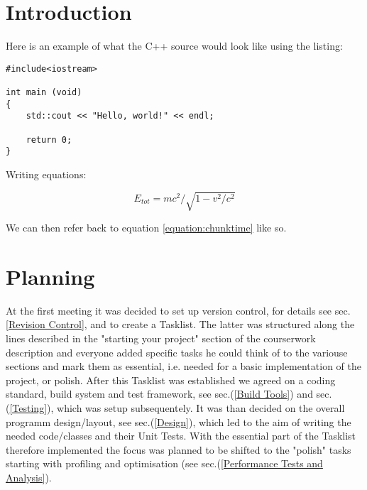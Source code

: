 \documentclass[12pt,a4paper]{article}
\begin{document}
\maketitle
\newpage


\tableofcontents
\newpage




\section{Introduction}

Here is an example of what the C++ source would look like using the listing: 
 
\begin{lstlisting}
#include<iostream> 

int main (void)
{
	std::cout << "Hello, world!" << endl;

	return 0; 
}
\end{lstlisting}

Writing equations:  

\begin{equation} 
E_{tot} = m c^2 / \sqrt{1 - {v^2/c^2}}
\label{equation:chunktime}
\end{equation}

We can then refer back to equation \ref{equation:chunktime} like so. 




\section{Planning}
\label{Planning}
At the first meeting it was decided to set up version control, for details see sec.\ref{Revision Control}, and to create a Tasklist.
The latter was structured along the lines described in the "starting your project" section of the courserwork description and everyone
added specific tasks he could think of to the variouse sections and mark them as essential, i.e. needed for a basic implementation of the project, or polish.
After this Tasklist was established we agreed on a coding standard, build system and test framework, see sec.(\ref{Build Tools}) and sec.(\ref{Testing}), which was setup subsequentely.
It was than decided on the overall programm design/layout, see sec.(\ref{Design}), which led to the aim of writing the needed code/classes and their Unit Tests.
With the essential part of the Tasklist therefore implemented the focus was planned to be shifted to the "polish" tasks starting with profiling and optimisation (see sec.(\ref{Performance Tests and Analysis}).
\end{document}
